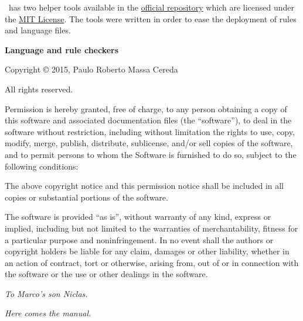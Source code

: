 \documentclass[a4paper,twoside,12pt]{memoir}
\begin{document}
{\ornamentline

\vspace{1em}

\arara\ has two helper tools available in the \href{https://github.com/cereda/arara}{official repository} which are licensed under the \href{http://opensource.org/licenses/MIT}{MIT License}. The tools were written in order to ease the deployment of rules and language files.

\vspace{1.5em}

{\sffamily\bfseries\textcolor{araracolour}{Language and rule checkers}}

Copyright \copyright{} 2015, Paulo Roberto Massa Cereda

All rights reserved.

\vspace{1em}

Permission is hereby granted, free of charge, to any person obtaining a copy of this software and associated documentation files (the ``software''), to deal in the software without restriction, including without limitation the rights to use, copy, modify, merge, publish, distribute, sublicense, and/or sell copies of the software, and to permit persons to whom the Software is furnished to do so, subject to the following conditions:

\vspace{1em}

The above copyright notice and this permission notice shall be included in all copies or substantial portions of the software.

\vspace{1em}

The software is provided ``as is'', without warranty of any kind, express or implied, including but not limited to the warranties of merchantability, fitness for a particular purpose and noninfringement. In no event shall the authors or copyright holders be liable for any claim, damages or other liability, whether in an action of contract, tort or otherwise, arising from, out of or in connection with the software or the use or other dealings in the software.

\ornamentline}

\cleardoublepage

\vspace*{25em}

\begin{flushright}
\em To Marco's son Niclas.
\end{flushright}

\cleardoublepage

\tableofcontents*

\cleardoublepage

\listoffigures*

\cleardoublepage

\listoftables*

\cleardoublepage

\listofcodes*

\mainmatter

\emph{Here comes the manual.}
\end{document}
